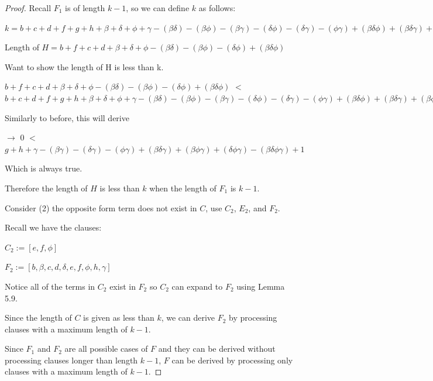\documentclass[manuscript]{acmart}
\begin{document}
\begin{proof}
        Recall $F_1$ is of length $k - 1$, so we can define $k$ as follows:

        $k = b + c + d + f + g + h 
        + \beta + \delta + \phi + \gamma
        - (\beta \delta) - (\beta \phi) - (\beta \gamma) - (\delta \phi) - (\delta \gamma) - (\phi \gamma)
        + (\beta \delta \phi) + (\beta \delta \gamma) + (\beta \phi \gamma) + (\delta \phi \gamma)
        - (\beta \delta \phi \gamma)
        + 1
        $

        Length of $H = b + f + c + d 
        + \beta + \delta + \phi
        - (\beta \delta) - (\beta \phi) - (\delta \phi)
        + (\beta \delta \phi) $

        Want to show the length of H is less than k.

        $b + f + c + d 
        + \beta + \delta + \phi
        - (\beta \delta) - (\beta \phi) - (\delta \phi)
        + (\beta \delta \phi) $
        $<$
        $b + c + d + f + g + h 
        + \beta + \delta + \phi + \gamma
        - (\beta \delta) - (\beta \phi) - (\beta \gamma) - (\delta \phi) - (\delta \gamma) - (\phi \gamma)
        + (\beta \delta \phi) + (\beta \delta \gamma) + (\beta \phi \gamma) + (\delta \phi \gamma)
        - (\beta \delta \phi \gamma)
        + 1
        $

        Similarly to before, this will derive 

        $\rightarrow$
        $0$
        $<$
        $g + h 
        + \gamma
        - (\beta \gamma) - (\delta \gamma) - (\phi \gamma)
        + (\beta \delta \gamma) + (\beta \phi \gamma) + (\delta \phi \gamma)
        - (\beta \delta \phi \gamma)
        + 1
        $

        Which is always true.
        
        Therefore the length of $H$ is less than $k$ when the length of $F_1$ is $k - 1$.

        Consider (2) the opposite form term does not exist in $C$, use $C_2$, $E_2$, and $F_2$.

        Recall we have the clauses:

        $C_2 := [e, f, \phi]$

        $F_2 := [b, \beta, c, d, \delta, e, f, \phi, h, \gamma]$

        Notice all of the terms in $C_2$ exist in $F_2$ so $C_2$ can expand to $F_2$ using Lemma 5.9.

        Since the length of $C$ is given as less than $k$, we can derive $F_2$ by processing clauses with a maximum length of $k - 1$.

        Since $F_1$ and $F_2$ are all possible cases of $F$ and they can be derived without processing clauses longer than length $k-1$, $F$ can be derived by processing only clauses with a maximum length of $k-1$.
    \end{proof}
\end{document}

